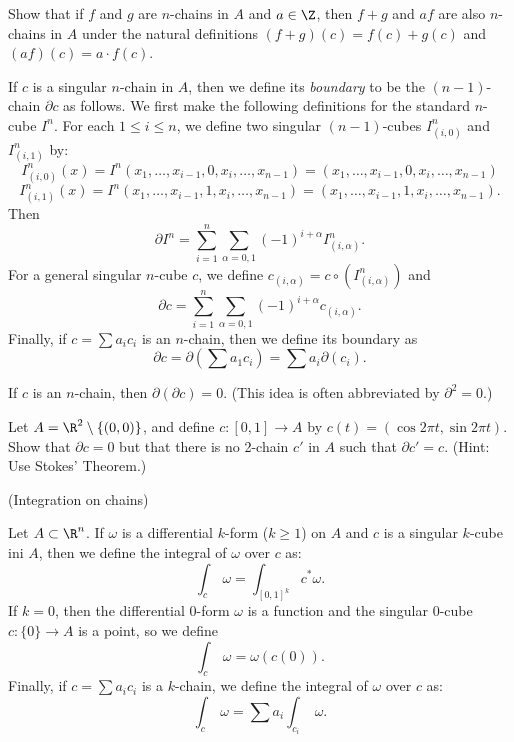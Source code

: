 \documentclass{book}
\begin{document}
\begin{exercise}
Show that if $f$ and $g$ are $n$-chains in $A$ and $a\in\Z$, then $f+g$ and $af$ are also 
$n$-chains in $A$ under the natural definitions $(f+g)(c)=f(c)+g(c)$ and $(af)(c)=a\cdot f(c)$.
\end{exercise}

\begin{definition}
If $c$ is a singular $n$-chain in $A$, then we define its {\em boundary} to be the $(n-1)$-chain
$\partial c$ as follows.  We first make the following definitions for the standard $n$-cube $I^n$.
For each $1\leq i\leq n$, we define two singular $(n-1)$-cubes
$I^n_{(i,0)}$ and $I^n_{(i,1)}$ by:
$$I^n_{(i,0)}(x)=I^n(x_1, \ldots, x_{i-1}, 0, x_i, \ldots, x_{n-1})
=(x_1, \ldots, x_{i-1}, 0, x_i, \ldots, x_{n-1})$$
$$I^n_{(i,1)}(x)=I^n(x_1, \ldots, x_{i-1}, 1, x_i, \ldots, x_{n-1})
=(x_1, \ldots, x_{i-1}, 1, x_i, \ldots, x_{n-1}).$$
Then
$$\partial I^n=\sum_{i=1}^n\sum_{\alpha =0, 1}(-1)^{i+\alpha}I^n_{(i, \alpha)}.$$
For a general singular $n$-cube $c$, we define $c_{(i, \alpha)}=c\circ (I^n_{(i, \alpha)})$
and 
$$\partial c=\sum_{i=1}^n\sum_{\alpha =0, 1}(-1)^{i+\alpha}c_{(i, \alpha)}.$$
Finally, if $c=\sum a_ic_i$ is an $n$-chain, then we define its boundary as
$$\partial c=\partial(\sum a_1c_i)=\sum a_i\partial (c_i).$$
\end{definition}

\begin{theorem}
If $c$ is an $n$-chain, then $\partial (\partial c)=0$.  
(This idea is often abbreviated by $\partial^2=0$.)
\end{theorem}

\begin{exercise}
Let $A=\R^2\setminus \{(0,0)\}$, and define $c:[0,1]\to A$ by $c(t)=(\cos 2\pi t, \sin 2\pi t)$.
Show that $\partial c=0$ but that there is no 2-chain $c'$ in $A$ such that $\partial c'=c$.
(Hint:  Use Stokes' Theorem.)
\end{exercise}

\begin{definition}
(Integration on chains)

Let $A\subset\R^n$.  If $\omega$ is a differential $k$-form ($k\geq 1$)
on $A$ and $c$ is a singular $k$-cube
ini $A$, then we define the integral of $\omega$ over $c$ as:
$$\int_c\;\omega =\int_{[0,1]^k}c^*\omega.$$
If $k=0$, then the differential 0-form $\omega$ is a function and the singular 0-cube $c:\{0\}\to A$ 
is a point, so we define
$$\int_c\;\omega =\omega (c(0)).$$
Finally, if $c=\sum a_ic_i$ is a $k$-chain, we define the integral of $\omega$ over $c$ as:
$$\int_c\;\omega=\sum a_i\int_{c_i}\;\omega.$$
\end{definition}
\end{document}

